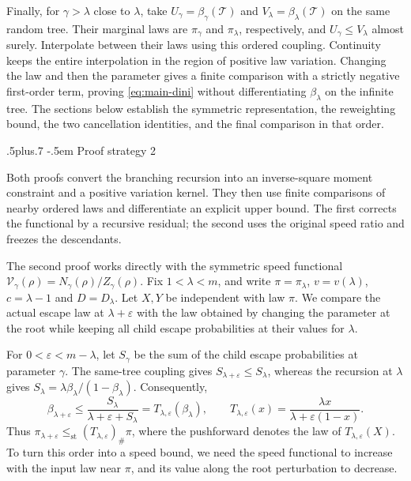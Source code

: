 \documentclass[11pt,reqno]{amsart}
\makeatletter
\def\subsection{\@startsection{subsection}{2}{0pt}%
  {.5\linespacing plus.7\linespacing}
  {-.5em}
  {\normalfont\scshape}}
\theoremstyle{plain}
\theoremstyle{definition}
\theoremstyle{remark}
\numberwithin{equation}{section}
\makeatother
\begin{document}
Finally, for $\gamma>\lambda$ close to $\lambda$, take
$U_\gamma=\beta_\gamma(\mathcal{T})$ and $V_\lambda=\beta_\lambda(\mathcal{T})$ on the same
random tree. Their marginal laws are $\pi_\gamma$ and $\pi_\lambda$,
respectively, and $U_\gamma\le V_\lambda$ almost surely. Interpolate
between their laws using this ordered coupling. Continuity keeps the entire
interpolation in the region of positive law variation. Changing the law
and then the parameter gives a finite comparison with a strictly negative
first-order term, proving \eqref{eq:main-dini} without differentiating
$\beta_\lambda$ on the infinite tree. The sections below establish the
symmetric representation, the reweighting bound, the two cancellation
identities, and the final comparison in that order.

\subsection{Proof strategy 2}\label{subsec:proof-strategy-2}

Both proofs convert the branching recursion into an inverse-square
moment constraint and a positive variation kernel. They then use finite
comparisons of nearby ordered laws and differentiate an explicit upper
bound. The first corrects the functional by a recursive residual; the
second uses the original speed ratio and freezes the descendants.

The second proof works directly with the symmetric speed functional
$\mathcal V_\gamma(\rho)=N_\gamma(\rho)/Z_\gamma(\rho)$. Fix
$1<\lambda<m$, and write $\pi=\pi_\lambda$, $v=v(\lambda)$,
$c=\lambda-1$ and $D=D_\lambda$. Let $X,Y$ be independent with law
$\pi$. We compare the actual escape law at
$\lambda+\varepsilon$ with the law obtained by changing the parameter
at the root while keeping all child escape probabilities at their
values for $\lambda$.

For $0<\varepsilon<m-\lambda$, let $S_\gamma$ be the sum of the child
escape probabilities at parameter $\gamma$. The same-tree coupling gives
$S_{\lambda+\varepsilon}\le S_\lambda$, whereas the recursion at
$\lambda$ gives $S_\lambda=\lambda\beta_\lambda/(1-\beta_\lambda)$.
Consequently,
\[
 \beta_{\lambda+\varepsilon}
 \le\frac{S_\lambda}{\lambda+\varepsilon+S_\lambda}
 =T_{\lambda,\varepsilon}(\beta_\lambda),
 \qquad
 T_{\lambda,\varepsilon}(x)
 =\frac{\lambda x}{\lambda+\varepsilon(1-x)}.
\]
Thus $\pi_{\lambda+\varepsilon}\le_{\mathrm{st}}
(T_{\lambda,\varepsilon})_\#\pi$, where the pushforward denotes the
law of $T_{\lambda,\varepsilon}(X)$. To turn this order into a speed
bound, we need the speed functional to increase with the input law
near $\pi$, and its value along the root perturbation to decrease.
\end{document}
